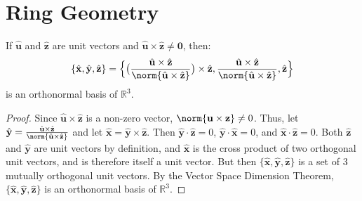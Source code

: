 \documentclass[crop=false,class=book,oneside]{standalone}
\begin{document}
    \section{Ring Geometry}
        \begin{theorem}
            \label{theorem:ring_occ_geom_x_y_z_orthonormal_basis}
            If $\hat{\mathbf{u}}$ and $\hat{\mathbf{z}}$ are unit
            vectors and
            $\hat{\mathbf{u}}\times%
             \hat{\mathbf{z}}\ne\mathbf{0}$,
            then:
            \begin{equation}
                \label{eqn:Cassini_Math_Saturn_Basis}
                \{\hat{\mathbf{x}},\hat{\mathbf{y}},
                \hat{\mathbf{z}}\}
                =\Big\{\big(
                    \frac{\hat{\mathbf{u}}\times\hat{\mathbf{z}}}
                         {\norm{\hat{\mathbf{u}}\times
                          \hat{\mathbf{z}}}}
                \big)\times\hat{\mathbf{z}},
                \frac{\hat{\mathbf{u}}\times\hat{\mathbf{z}}}
                     {\norm{\hat{\mathbf{u}}\times
                      \hat{\mathbf{z}}}},
                \hat{\mathbf{z}}\Big\}
            \end{equation}
            is an orthonormal basis of $\mathbb{R}^{3}$.
        \end{theorem}
        \begin{proof}
            Since $\hat{\mathbf{u}}\times\hat{\mathbf{z}}$ is a
            non-zero vector,
            $\norm{\mathbf{u}\times\mathbf{z}}\ne{0}$. Thus, let
            $\hat{\mathbf{y}}%
             =\frac{\hat{\mathbf{u}}\times\hat{\mathbf{z}}}%
                   {\norm{\hat{\mathbf{u}}\times\hat{\mathbf{z}}}}$
            and let
            $\hat{\mathbf{x}}%
             =\hat{\mathbf{y}}\times\hat{\mathbf{z}}$.
            Then $\hat{\mathbf{y}}\cdot\hat{\mathbf{z}}=0$,
            $\hat{\mathbf{y}}\cdot\hat{\mathbf{x}}=0$,
            and $\hat{\mathbf{x}}\cdot\hat{\mathbf{z}}=0$.
            Both $\hat{\mathbf{z}}$ and $\hat{\mathbf{y}}$ are unit
            vectors by definition, and $\hat{\mathbf{x}}$ is the
            cross product of two orthogonal unit vectors, and is
            therefore itself a unit vector. But then
            $\{\hat{\mathbf{x}},\hat{\mathbf{y}},\hat{\mathbf{z}}\}$
            is a set of 3 mutually orthogonal unit vectors.
            By the Vector Space Dimension Theorem,
            $\{\hat{\mathbf{x}},%
               \hat{\mathbf{y}},%
               \hat{\mathbf{z}}\}$
            is an orthonormal basis of $\mathbb{R}^3$.
        \end{proof}
\end{document}
